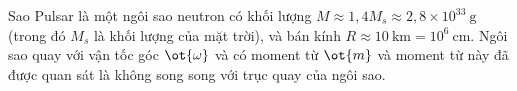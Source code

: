 \begin{vd}
Sao Pulsar là một ngôi sao neutron có khối lượng $M \approx 1,4  M_s \approx 2,8 \times 10^{33}~\mathrm{g}$ (trong đó $M_s$ là khối lượng của mặt trời), và bán kính $R \approx 10 ~\mathrm{km} = 10^6 ~\mathrm{cm}$. Ngôi sao quay với vận tốc góc $\ot{\omega}$ và có moment từ $\ot{m}$ và moment từ này đã được quan sát là không song song với trục quay của ngôi sao. 
\begin{center}



\begin{tikzpicture}[x=0.75pt,y=0.75pt,yscale=-1,xscale=1]


\end{tikzpicture}
\end{center}
\end{vd}
